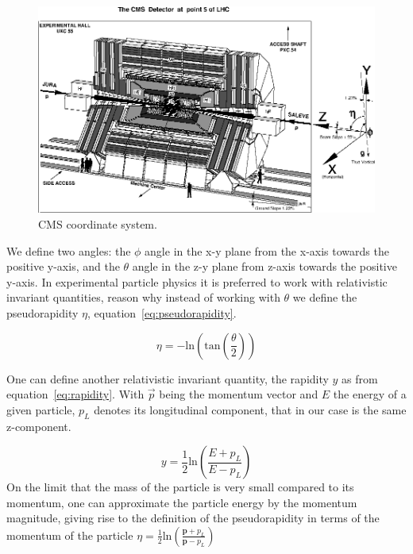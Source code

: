 \begin{figure}[!Hhtbp]
  \begin{center}
    \includegraphics[width=\textwidth]{figs/CMS_coordinates.jpg}
    \caption{CMS coordinate system. }
    \label{fig:cmscoor}
  \end{center}
\end{figure}

We define two angles: the $\phi$ angle in the x-y plane from the x-axis towards the positive y-axis, and the $\theta$ angle in the z-y plane from z-axis towards the positive y-axis. In experimental particle physics it is preferred to work with relativistic invariant quantities, reason why instead of working with $\theta$ we define the pseudorapidity $\eta$, equation~\ref{eq:pseudorapidity}. 

\begin{equation}
  \label{eq:pseudorapidity}
  \eta = -\text{ln}\left( \text{tan}\left(\frac{\theta}{2}\right)\right)
\end{equation} 

One can define another relativistic invariant quantity, the rapidity $y$ as from equation~\ref{eq:rapidity}. With $\vec{p}$ being the momentum vector and $E$ the energy of a given particle, $p_{L}$ denotes its longitudinal component, that in our case is the same z-component. 

\begin{equation}
  \label{eq:rapidity}
  y=\frac{1}{2}\text{ln}\left(\frac{E+p_{L}}{E-p_{L}}\right)
\end{equation} On the limit that the mass of the particle is very small compared to its momentum, one can approximate the particle energy by the momentum magnitude, giving rise to the definition of the pseudorapidity in terms of the momentum of the particle $\eta = \frac{1}{2}\text{ln}\left(\frac{\bm{p}+p_{L}}{\bm{p}-p_{L}}\right)$

